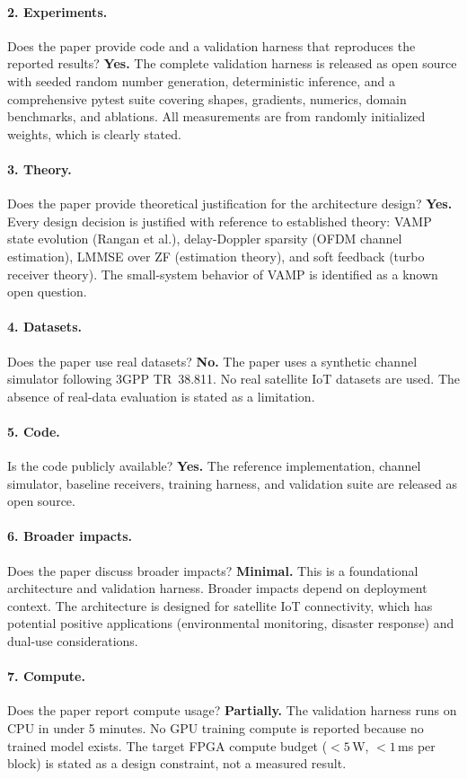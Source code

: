 \documentclass{article}
\begin{document}
\paragraph{2. Experiments.}
Does the paper provide code and a validation harness that reproduces the reported results?
\textbf{Yes.} The complete validation harness is released as open source with seeded random number generation, deterministic inference, and a comprehensive pytest suite covering shapes, gradients, numerics, domain benchmarks, and ablations. All measurements are from randomly initialized weights, which is clearly stated.

\paragraph{3. Theory.}
Does the paper provide theoretical justification for the architecture design?
\textbf{Yes.} Every design decision is justified with reference to established theory: VAMP state evolution (Rangan et al.), delay-Doppler sparsity (OFDM channel estimation), LMMSE over ZF (estimation theory), and soft feedback (turbo receiver theory). The small-system behavior of VAMP is identified as a known open question.

\paragraph{4. Datasets.}
Does the paper use real datasets?
\textbf{No.} The paper uses a synthetic channel simulator following 3GPP TR~38.811. No real satellite IoT datasets are used. The absence of real-data evaluation is stated as a limitation.

\paragraph{5. Code.}
Is the code publicly available?
\textbf{Yes.} The reference implementation, channel simulator, baseline receivers, training harness, and validation suite are released as open source.

\paragraph{6. Broader impacts.}
Does the paper discuss broader impacts?
\textbf{Minimal.} This is a foundational architecture and validation harness. Broader impacts depend on deployment context. The architecture is designed for satellite IoT connectivity, which has potential positive applications (environmental monitoring, disaster response) and dual-use considerations.

\paragraph{7. Compute.}
Does the paper report compute usage?
\textbf{Partially.} The validation harness runs on CPU in under 5 minutes. No GPU training compute is reported because no trained model exists. The target FPGA compute budget ($<5$\,W, $<1$\,ms per block) is stated as a design constraint, not a measured result.
\end{document}
